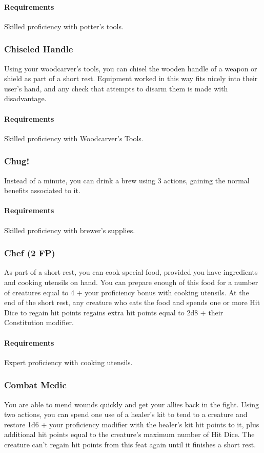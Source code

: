     \paragraph{Requirements} Skilled proficiency with potter's tools.
\subsubsection{Chiseled Handle} \label{feat::chiseledhandle}
    Using your woodcarver's tools, you can chisel the wooden handle of a weapon or shield as part of a short rest.
    Equipment worked in this way fits nicely into their user's hand, and any check that attempts to disarm them is made with disadvantage.
    \paragraph{Requirements} Skilled proficiency with Woodcarver's Tools.
\subsubsection{Chug!} \label{feat::chug}
    Instead of a minute, you can drink a brew using 3 actions, gaining the normal benefits associated to it.
    \paragraph{Requirements} Skilled proficiency with brewer's supplies.
\subsubsection{Chef (2 FP)} \label{feat::chef}
    As part of a short rest, you can cook special food, provided you have ingredients and cooking utensils on hand.
    You can prepare enough of this food for a number of creatures equal to 4 + your proficiency bonus with cooking utensils.
    At the end of the short rest, any creature who eats the food and spends one or more Hit Dice to regain hit points regains extra hit points equal to 2d8 + their Constitution modifier.
    \paragraph{Requirements} Expert proficiency with cooking utensils.
\subsubsection{Combat Medic} \label{feat::combatmedic}
    You are able to mend wounds quickly and get your allies back in the fight.
    Using two actions, you can spend one use of a healer's kit to tend to a creature and restore 1d6 + your proficiency modifier with the healer's kit hit points to it, plus additional hit points equal to the creature's maximum number of Hit Dice.
    The creature can't regain hit points from this feat again until it finishes a short rest.

